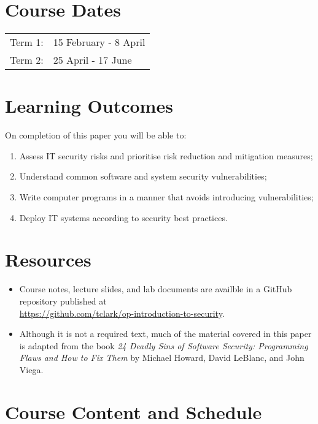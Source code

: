\documentclass{article}
\begin{document}
\section*{Course Dates}
\begin{tabular}{ll}
	Term 1:  & 15 February - 8 April\\
	Term 2:  & 25 April - 17 June\\
\end{tabular}

\newpage 

\section*{Learning Outcomes}
On completion of this paper you will be able to:
\begin{enumerate}
  \item Assess IT security risks and prioritise risk reduction and
	  mitigation measures;
  \item Understand common software and system security vulnerabilities;
  \item Write computer programs in a manner that avoids introducing 
	  vulnerabilities;
  \item Deploy IT systems according to security best practices.
\end{enumerate}

\section*{Resources}
\begin{itemize}
	\item Course notes, lecture slides, and lab documents are availble in a GitHub 
		repository published at \\ \url{https://github.com/tclark/op-introduction-to-security}.
	\item Although it is not a required text, much of the material covered in this paper is 
		adapted from the book \emph{24 Deadly Sins of Software Security: Programming Flaws and 
		How to Fix Them} by Michael Howard, David LeBlanc, and John Viega.
	
\end{itemize}


\section*{Course Content and Schedule}
\end{document}
